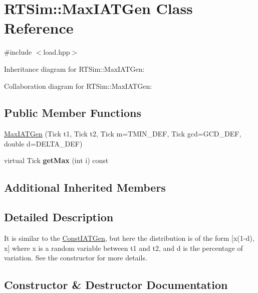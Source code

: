 \hypertarget{classRTSim_1_1MaxIATGen}{}\section{R\+T\+Sim\+:\+:Max\+I\+A\+T\+Gen Class Reference}
\label{classRTSim_1_1MaxIATGen}


{\ttfamily \#include $<$load.\+hpp$>$}



Inheritance diagram for R\+T\+Sim\+:\+:Max\+I\+A\+T\+Gen\+:


Collaboration diagram for R\+T\+Sim\+:\+:Max\+I\+A\+T\+Gen\+:
\subsection*{Public Member Functions}
\begin{DoxyCompactItemize}
\item 
\hyperlink{classRTSim_1_1MaxIATGen_a194e2d41069eb368c38de6fade16b4ee}{Max\+I\+A\+T\+Gen} (Tick t1, Tick t2, Tick m=T\+M\+I\+N\+\_\+\+D\+EF, Tick gcd=G\+C\+D\+\_\+\+D\+EF, double d=D\+E\+L\+T\+A\+\_\+\+D\+EF)
\item 
virtual Tick {\bfseries get\+Max} (int i) const \hypertarget{classRTSim_1_1MaxIATGen_a6d947ba5ba7e304b686a61b59c5e49d1}{}\label{classRTSim_1_1MaxIATGen_a6d947ba5ba7e304b686a61b59c5e49d1}

\end{DoxyCompactItemize}
\subsection*{Additional Inherited Members}


\subsection{Detailed Description}
It is similar to the \hyperlink{classRTSim_1_1ConstIATGen}{Const\+I\+A\+T\+Gen}, but here the distribution is of the form \mbox{[}x(1-\/d), x\mbox{]} where x is a random variable between t1 and t2, and d is the percentage of variation. See the constructor for more details. 

\subsection{Constructor \& Destructor Documentation}
